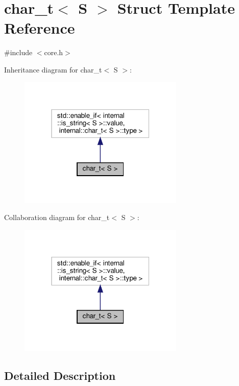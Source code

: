 \hypertarget{structchar__t}{}\section{char\+\_\+t$<$ S $>$ Struct Template Reference}
\label{structchar__t}


{\ttfamily \#include $<$core.\+h$>$}



Inheritance diagram for char\+\_\+t$<$ S $>$\+:
\nopagebreak
\begin{figure}[H]
\begin{center}
\leavevmode
\includegraphics[width=223pt]{structchar__t__inherit__graph}
\end{center}
\end{figure}


Collaboration diagram for char\+\_\+t$<$ S $>$\+:
\nopagebreak
\begin{figure}[H]
\begin{center}
\leavevmode
\includegraphics[width=223pt]{structchar__t__coll__graph}
\end{center}
\end{figure}


\subsection{Detailed Description}
